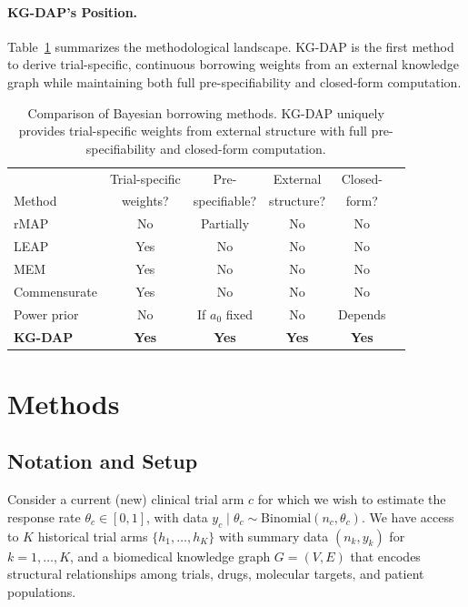 \documentclass[12pt]{article}
\newcommand{\thetac}{\theta_c}
\begin{document}
\paragraph{KG-DAP's Position.}
Table~\ref{tab:method_comparison} summarizes the methodological landscape. KG-DAP is the first method to derive trial-specific, continuous borrowing weights from an external knowledge graph while maintaining both full pre-specifiability and closed-form computation.

\begin{table}[t]
\centering
\caption{Comparison of Bayesian borrowing methods. KG-DAP uniquely provides trial-specific weights from external structure with full pre-specifiability and closed-form computation.}
\label{tab:method_comparison}
\begin{tabular}{lccccc}
\toprule
& Trial-specific & Pre- & External & Closed- \\
Method & weights? & specifiable? & structure? & form? \\
\midrule
rMAP \citep{schmidli2014robust} & No & Partially & No & No \\
LEAP \citep{alt2024leap} & Yes & No & No & No \\
MEM \citep{kaizer2018bayesian} & Yes & No & No & No \\
Commensurate \citep{hobbs2011hierarchical} & Yes & No & No & No \\
Power prior \citep{ibrahim2000power} & No & If $a_0$ fixed & No & Depends \\
\textbf{KG-DAP} & \textbf{Yes} & \textbf{Yes} & \textbf{Yes} & \textbf{Yes} \\
\bottomrule
\end{tabular}
\end{table}

\section{Methods}
\label{sec:methods}

\subsection{Notation and Setup}
\label{sec:notation}

Consider a current (new) clinical trial arm $c$ for which we wish to estimate the response rate $\thetac \in [0,1]$, with data $y_c \mid \thetac \sim \mathrm{Binomial}(n_c, \thetac)$. We have access to $K$ historical trial arms $\{h_1, \ldots, h_K\}$ with summary data $(n_k, y_k)$ for $k = 1, \ldots, K$, and a biomedical knowledge graph $G = (V, E)$ that encodes structural relationships among trials, drugs, molecular targets, and patient populations.
\end{document}
